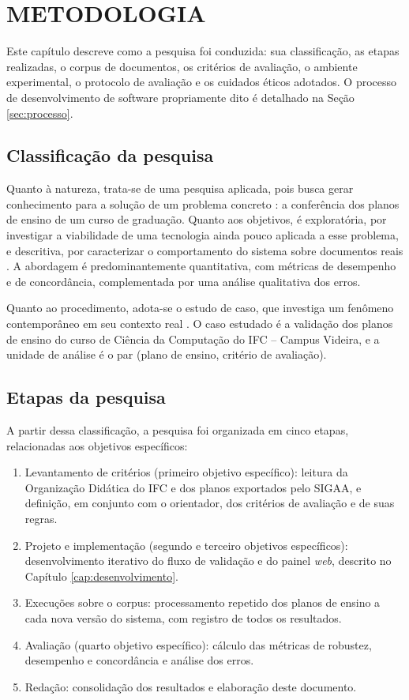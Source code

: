 \chapter{METODOLOGIA}
\label{cap:metodologia}

Este capítulo descreve como a pesquisa foi conduzida: sua classificação, as etapas realizadas, o corpus de documentos, os critérios de avaliação, o ambiente experimental, o protocolo de avaliação e os cuidados éticos adotados. O processo de desenvolvimento de software propriamente dito é detalhado na Seção \ref{sec:processo}.

\section{Classificação da pesquisa}

Quanto à natureza, trata-se de uma pesquisa aplicada, pois busca gerar conhecimento para a solução de um problema concreto \cite{Gil2017}: a conferência dos planos de ensino de um curso de graduação. Quanto aos objetivos, é exploratória, por investigar a viabilidade de uma tecnologia ainda pouco aplicada a esse problema, e descritiva, por caracterizar o comportamento do sistema sobre documentos reais \cite{Gil2017}. A abordagem é predominantemente quantitativa, com métricas de desempenho e de concordância, complementada por uma análise qualitativa dos erros.

Quanto ao procedimento, adota-se o estudo de caso, que investiga um fenômeno contemporâneo em seu contexto real \cite{Yin2015}. O caso estudado é a validação dos planos de ensino do curso de Ciência da Computação do IFC -- Campus Videira, e a unidade de análise é o par (plano de ensino, critério de avaliação).

\section{Etapas da pesquisa}

A partir dessa classificação, a pesquisa foi organizada em cinco etapas, relacionadas aos objetivos específicos:

\begin{enumerate}
    \item Levantamento de critérios (primeiro objetivo específico): leitura da Organização Didática do IFC \cite{ifc2022} e dos planos exportados pelo SIGAA, e definição, em conjunto com o orientador, dos critérios de avaliação e de suas regras.
    \item Projeto e implementação (segundo e terceiro objetivos específicos): desenvolvimento iterativo do fluxo de validação e do painel \textit{web}, descrito no Capítulo \ref{cap:desenvolvimento}.
    \item Execuções sobre o corpus: processamento repetido dos planos de ensino a cada nova versão do sistema, com registro de todos os resultados.
    \item Avaliação (quarto objetivo específico): cálculo das métricas de robustez, desempenho e concordância e análise dos erros.
    \item Redação: consolidação dos resultados e elaboração deste documento.
\end{enumerate}

